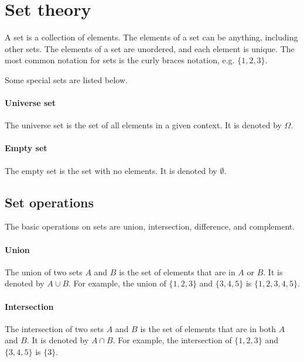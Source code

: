 
\section{Set theory}

A set is a collection of elements.  The elements of a set can be anything, including
other sets.  The elements of a set are unordered, and each element is unique.  The
most common notation for sets is the curly braces notation, e.g. $\{1, 2, 3\}$.

Some special sets are listed below.

\paragraph{Universe set}  The universe set is the set of all elements in a given context.
It is denoted by $\Omega$.

\paragraph{Empty set}  The empty set is the set with no elements.  It is denoted by
$\emptyset$.

\subsection{Set operations}

The basic operations on sets are union, intersection, difference, and complement.

\paragraph{Union}  The union of two sets $A$ and $B$ is the set of elements that are in
$A$ or $B$.  It is denoted by $A \cup B$.  For example, the union of $\{1, 2, 3\}$ and
$\{3, 4, 5\}$ is $\{1, 2, 3, 4, 5\}$.

\paragraph{Intersection}  The intersection of two sets $A$ and $B$ is the set of elements
that are in both $A$ and $B$.  It is denoted by $A \cap B$.  For example, the intersection
of $\{1, 2, 3\}$ and $\{3, 4, 5\}$ is $\{3\}$.


